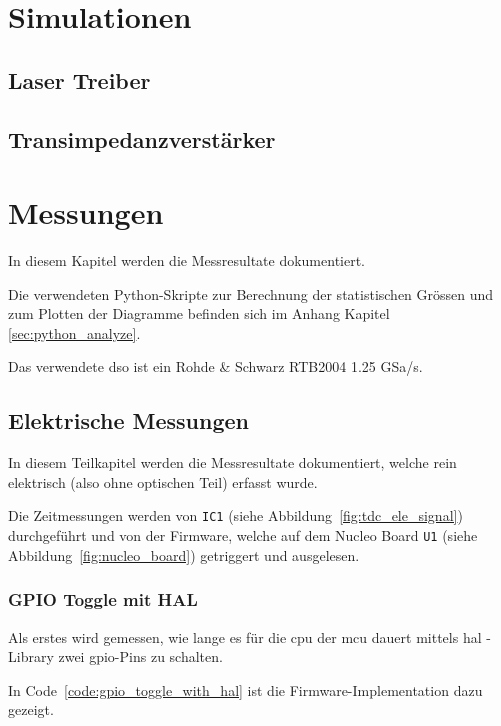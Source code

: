 \documentclass[11pt,a4paper,hidelinks]{article}
\begin{document}
\pagebreak

\section{Simulationen}

\subsection{Laser Treiber}
\subsection{Transimpedanzverstärker}

\pagebreak

\section{Messungen}

In diesem Kapitel werden die Messresultate dokumentiert.

Die verwendeten Python-Skripte zur Berechnung der statistischen Grössen und zum Plotten der Diagramme befinden sich im
Anhang Kapitel \ref{sec:python_analyze}.

Das verwendete \acrfull{dso} ist ein Rohde \& Schwarz RTB2004 1.25 GSa/s.

\subsection{Elektrische Messungen}

In diesem Teilkapitel werden die Messresultate dokumentiert, welche rein elektrisch (also ohne optischen Teil) erfasst
wurde.

Die Zeitmessungen werden von \lstinline|IC1| (siehe Abbildung~\ref{fig:tdc_ele_signal}) durchgeführt und von der
Firmware, welche auf dem Nucleo Board \lstinline|U1| (siehe Abbildung~\ref{fig:nucleo_board}) getriggert und ausgelesen.

\subsubsection{GPIO Toggle mit HAL}

Als erstes wird gemessen, wie lange es für die \acrshort{cpu} der \acrshort{mcu} dauert mittels \acrfull{hal} - Library
\cite{st2020stm32f0_hal} zwei \acrshort{gpio}-Pins zu schalten.

In Code~\ref{code:gpio_toggle_with_hal} ist die Firmware-Implementation dazu gezeigt.
\end{document}
